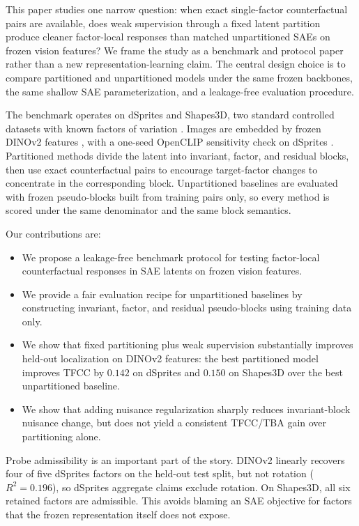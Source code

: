 \documentclass[10pt,twocolumn]{article}
\newcommand{\tfcc}{\textsc{TFCC}}
\newcommand{\tba}{\textsc{TBA}}
\begin{document}
This paper studies one narrow question: when exact single-factor counterfactual pairs are available, does weak supervision through a fixed latent partition produce cleaner factor-local responses than matched unpartitioned SAEs on frozen vision features? We frame the study as a benchmark and protocol paper rather than a new representation-learning claim. The central design choice is to compare partitioned and unpartitioned models under the same frozen backbones, the same shallow SAE parameterization, and a leakage-free evaluation procedure.

The benchmark operates on dSprites and Shapes3D, two standard controlled datasets with known factors of variation \citep{higgins2017betavae,kim2018factorvae,locatello2019challenging}. Images are embedded by frozen DINOv2 features \citep{oquab2023dinov2}, with a one-seed OpenCLIP sensitivity check on dSprites \citep{radford2021learning}. Partitioned methods divide the latent into invariant, factor, and residual blocks, then use exact counterfactual pairs to encourage target-factor changes to concentrate in the corresponding block. Unpartitioned baselines are evaluated with frozen pseudo-blocks built from training pairs only, so every method is scored under the same denominator and the same block semantics.

Our contributions are:
\begin{itemize}
  \item We propose a leakage-free benchmark protocol for testing factor-local counterfactual responses in SAE latents on frozen vision features.
  \item We provide a fair evaluation recipe for unpartitioned baselines by constructing invariant, factor, and residual pseudo-blocks using training data only.
  \item We show that fixed partitioning plus weak supervision substantially improves held-out localization on DINOv2 features: the best partitioned model improves \tfcc{} by $0.142$ on dSprites and $0.150$ on Shapes3D over the best unpartitioned baseline.
  \item We show that adding nuisance regularization sharply reduces invariant-block nuisance change, but does not yield a consistent \tfcc{}/\tba{} gain over partitioning alone.
\end{itemize}

Probe admissibility is an important part of the story. DINOv2 linearly recovers four of five dSprites factors on the held-out test split, but not rotation ($R^2 = 0.196$), so dSprites aggregate claims exclude rotation. On Shapes3D, all six retained factors are admissible. This avoids blaming an SAE objective for factors that the frozen representation itself does not expose.
\end{document}
